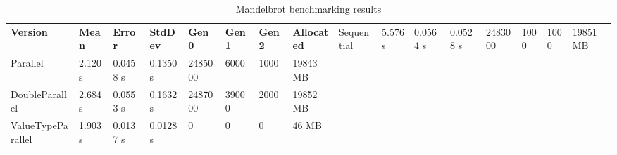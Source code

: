 \begin{sidewaystable}[!ht]
    \centering
    \caption{Mandelbrot benchmarking results}
		\label{tab: MandelbrotBenchmarking}
    \begin{tabular}{lp{3cm}p{1.5cm}p{1.5cm}p{2cm}p{2cm}p{2cm}p{2cm}}
			\toprule
			\bfseries Version 	&
			\bfseries Mean    	&
			\bfseries Error	    &
			\bfseries StdDev	  &
			\bfseries Gen 0	    &
			\bfseries Gen 1	    &
			\bfseries Gen 2	    &
			\bfseries Allocated &
			\midrule 
			Sequential & 5.576 s & 0.0564 s & 0.0528 s & 2483000 & 1000 & 1000 & 19851 MB \\ 
			Parallel & 2.120 s & 0.0458 s & 0.1350 s & 2485000 & 6000 & 1000 & 19843 MB \\ 
			DoubleParallel & 2.684 s & 0.0553 s & 0.1632 s & 2487000 & 39000 & 2000 & 19852 MB \\ 
			ValueTypeParallel & 1.903 s & 0.0137 s & 0.0128 s & 0 & 0 & 0 & 46 MB \\ 
			\bottomrule
    \end{tabular}
\end{sidewaystable}